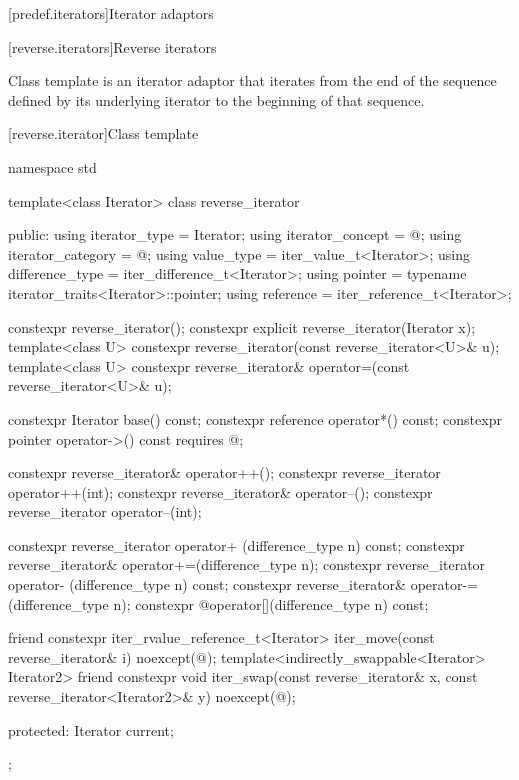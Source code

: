 [predef.iterators]{Iterator adaptors}

[reverse.iterators]{Reverse iterators}

\pnum
Class template  is an iterator adaptor that iterates from the end of the sequence defined by its underlying iterator to the beginning of that sequence.

[reverse.iterator]{Class template }

%
\begin{codeblock}
namespace std {
  template<class Iterator>
  class reverse_iterator {
  public:
    using iterator_type     = Iterator;
    using iterator_concept  = @\seebelow@;
    using iterator_category = @\seebelow@;
    using value_type        = iter_value_t<Iterator>;
    using difference_type   = iter_difference_t<Iterator>;
    using pointer           = typename iterator_traits<Iterator>::pointer;
    using reference         = iter_reference_t<Iterator>;

    constexpr reverse_iterator();
    constexpr explicit reverse_iterator(Iterator x);
    template<class U> constexpr reverse_iterator(const reverse_iterator<U>& u);
    template<class U> constexpr reverse_iterator& operator=(const reverse_iterator<U>& u);

    constexpr Iterator base() const;
    constexpr reference operator*() const;
    constexpr pointer   operator->() const requires @\seebelow@;

    constexpr reverse_iterator& operator++();
    constexpr reverse_iterator  operator++(int);
    constexpr reverse_iterator& operator--();
    constexpr reverse_iterator  operator--(int);

    constexpr reverse_iterator  operator+ (difference_type n) const;
    constexpr reverse_iterator& operator+=(difference_type n);
    constexpr reverse_iterator  operator- (difference_type n) const;
    constexpr reverse_iterator& operator-=(difference_type n);
    constexpr @\unspec@ operator[](difference_type n) const;

    friend constexpr iter_rvalue_reference_t<Iterator>
      iter_move(const reverse_iterator& i) noexcept(@\seebelow@);
    template<indirectly_swappable<Iterator> Iterator2>
      friend constexpr void
        iter_swap(const reverse_iterator& x,
                  const reverse_iterator<Iterator2>& y) noexcept(@\seebelow@);

  protected:
    Iterator current;
  };
}
\end{codeblock}

